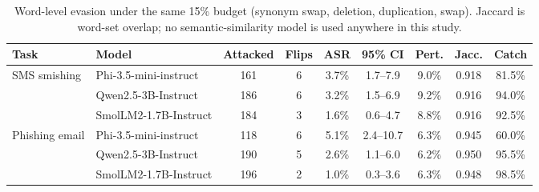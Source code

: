 \begin{table}[t]
\centering
\small
\caption{Word-level evasion under the same 15\% budget (synonym swap, deletion, duplication, swap). Jaccard is word-set overlap; no semantic-similarity model is used anywhere in this study.}
\label{tab:asr-word}
\begin{tabular}{llccccccc}
\toprule
\textbf{Task} & \textbf{Model} & \textbf{Attacked} & \textbf{Flips} & \textbf{ASR} & \textbf{95\% CI} & \textbf{Pert.} & \textbf{Jacc.} & \textbf{Catch} \\
\midrule
 SMS smishing & Phi-3.5-mini-instruct & 161 & 6 & 3.7\% & 1.7--7.9 & 9.0\% & 0.918 & 81.5\% \\
  & Qwen2.5-3B-Instruct & 186 & 6 & 3.2\% & 1.5--6.9 & 9.2\% & 0.916 & 94.0\% \\
  & SmolLM2-1.7B-Instruct & 184 & 3 & 1.6\% & 0.6--4.7 & 8.8\% & 0.916 & 92.5\% \\
\midrule
 Phishing email & Phi-3.5-mini-instruct & 118 & 6 & 5.1\% & 2.4--10.7 & 6.3\% & 0.945 & 60.0\% \\
  & Qwen2.5-3B-Instruct & 190 & 5 & 2.6\% & 1.1--6.0 & 6.2\% & 0.950 & 95.5\% \\
  & SmolLM2-1.7B-Instruct & 196 & 2 & 1.0\% & 0.3--3.6 & 6.3\% & 0.948 & 98.5\% \\
\bottomrule
\end{tabular}
\end{table}
